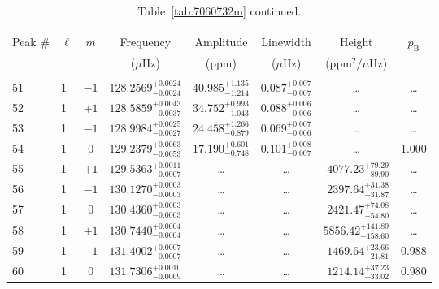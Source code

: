 \begin{table*}[!]
\caption{Table~\ref{tab:7060732m} continued.}
\label{tab:7060732m2}
\centering
\begin{tabular}{llcrrlrc}
\hline\hline
\\[-8pt]          
Peak \# & $\ell$ & $m$ & \multicolumn{1}{c}{Frequency} & \multicolumn{1}{c}{Amplitude} & \multicolumn{1}{c}{Linewidth} & \multicolumn{1}{c}{Height}& $p_\mathrm{B}$\\
 & & & \multicolumn{1}{c}{($\mu$Hz)} & \multicolumn{1}{c}{(ppm)} & \multicolumn{1}{c}{($\mu$Hz)} & \multicolumn{1}{c}{(ppm$^2/\mu$Hz)}\\
\hline \\[-8pt]
51 & 1 & $-1$ & $    128.2569_{-      0.0024}^{+      0.0024}$ & $      40.985_{-       1.214}^{+       1.135}$ & $       0.087_{-       0.007}^{+       0.007}$ & \multicolumn{1}{c}{\dots} & \dots \\[1pt]
52 & 1 & $+1$ & $    128.5859_{-      0.0037}^{+      0.0043}$ & $      34.752_{-       1.043}^{+       0.993}$ & $       0.088_{-       0.006}^{+       0.006}$ & \multicolumn{1}{c}{\dots} & \dots \\[1pt]
53 & 1 & $-1$ & $    128.9984_{-      0.0027}^{+      0.0025}$ & $      24.458_{-       0.879}^{+       1.266}$ & $       0.069_{-       0.006}^{+       0.007}$ & \multicolumn{1}{c}{\dots} & \dots \\[1pt]
54 & 1 & 0 & $    129.2379_{-      0.0053}^{+      0.0063}$ & $      17.190_{-       0.748}^{+       0.601}$ & $       0.101_{-       0.007}^{+       0.008}$ & \multicolumn{1}{c}{\dots} & 1.000\\[1pt]
55 & 1 & $+1$ & $    129.5363_{-      0.0007}^{+      0.0011}$ & \multicolumn{1}{c}{\dots} & \multicolumn{1}{c}{\dots} & $     4077.23_{-       89.90}^{+       79.29}$ & \dots \\[1pt]
56 & 1 & $-1$ & $    130.1270_{-      0.0003}^{+      0.0003}$ & \multicolumn{1}{c}{\dots} & \multicolumn{1}{c}{\dots} & $     2397.64_{-       31.87}^{+       31.38}$ & \dots \\[1pt]
57 & 1 & 0 & $    130.4360_{-      0.0003}^{+      0.0003}$ & \multicolumn{1}{c}{\dots} & \multicolumn{1}{c}{\dots} & $     2421.47_{-       54.80}^{+       74.08}$ & \dots \\[1pt]
58 & 1 & $+1$ & $    130.7440_{-      0.0004}^{+      0.0004}$ & \multicolumn{1}{c}{\dots} & \multicolumn{1}{c}{\dots} & $     5856.42_{-      158.60}^{+      141.89}$ & \dots \\[1pt]
59 & 1 & $-1$ & $    131.4002_{-      0.0007}^{+      0.0007}$ & \multicolumn{1}{c}{\dots} & \multicolumn{1}{c}{\dots} & $     1469.64_{-       21.81}^{+       23.66}$ & 0.988\\[1pt]
60 & 1 & 0 & $    131.7306_{-      0.0009}^{+      0.0010}$ & \multicolumn{1}{c}{\dots} & \multicolumn{1}{c}{\dots} & $     1214.14_{-       33.02}^{+       37.23}$ & 0.980\\[1pt]


\end{tabular}
\end{table*}
